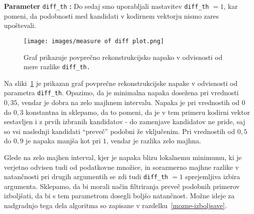 \documentclass[12pt,a4paper,twoside]{article}
\theoremstyle{definition} %
\theoremstyle{plain} %
\numberwithin{equation}{section}  %
\begin{document}
\textbf{Parameter} \texttt{diff\_th} \textbf{:} Do sedaj smo uporabljali nastavitev \texttt{diff\_th} $=1$, kar pomeni, da podobnosti med kandidati v kodirnem vektorju nismo zares upoštevali.
\begin{figure}[h]
	\centering
	\texttt{[image: images/measure of diff plot.png]}
	\caption[Graf napake glede na mero razlike.]{Graf prikazuje povprečno rekonstrukcijsko napako v odvisnosti od mere razlike \texttt{diff\_th.}}
	\label{fig:measure_of_diff}
\end{figure}
Na sliki~\ref{fig:measure_of_diff} je prikazan graf povprečne rekonstrukcijske napake v odvisnosti od parametra \texttt{diff\_th}.
Opazimo, da je minimalna napaka dosežena pri vrednosti $0,35$, vendar je dobra na zelo majhnem intervalu.
Napaka je pri vrednostih od $0$ do $0,3$ konstantna in sklepamo, da to pomeni, da je v tem primeru kodirni vektor sestavljen i z prvih izbranih kandidatov
- do zamenjave kandidatov ne pride, saj so vsi naslednji kandidati ``preveč'' podobni že vključenim.
Pri vrednostih od $0,5$ do $0,9$ je napaka manjša kot pri $1$, vendar je razlika zelo majhna.

Glede na zelo majhen interval, kjer je napaka blizu lokalnemu minimumu, ki je verjetno odvisen tudi od podatkovne množice, in sorazmerno majhne razlike v natančnosti pri drugih argumentih se zdi tudi \texttt{diff\_th} $=1$ sprejemljiva izbira argumenta.
Sklepamo, da bi morali način filtriranja preveč podobnih primerov izboljšati, da bi s tem parametrom dosegli boljšo natančnost.
Možne ideje za nadgradnjo tega dela algoritma so zapisane v razdelku~\ref{mozne-izboljsave}.



\end{document}
